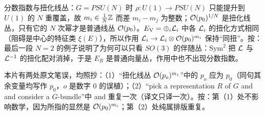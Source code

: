 \begin{yizhu}[易错点]
分数指数与扭化线丛：$G=PSU(N)$ 时 $\rho:U(1)\to PSU(N)$ 只能提升到 $U(1)$ 的 $N$ 重覆盖，故 $m_i\in{1\over N}\Bbb{Z}$ 而差 $m_i-m_j$ 为整数；${\cal O}(p_0)^{1/N}$ 是扭化线丛，只有它的 $N$ 次幂才是普通线丛 ${\cal O}(p_0)$。$E_\VV=\oplus_i{\cal L}_i$ 中各 ${\cal L}_i$ 的扭化方式相同（阻碍是中心的特征类 $\xi(E)$），所以作用 ${\cal L}_i\to{\cal L}_i\otimes{\cal O}(p_0)^{m_i}$ 保持“同扭”。按：最后一段 $N=2$ 的例子说明了为何可以只看 $SO(3)$ 的伴随丛：$\mathrm{Sym}^2$ 把 ${\cal L}$ 与 ${\cal L}^{-1}$ 的扭化配对消掉，于是 $E_R$ 是普通向量丛，作用中也不出现分数指数。
\end{yizhu}

\begin{yizhu}[原文疑误]
本片有两处原文笔误，均照抄：（1）“扭化线丛 ${\cal O}(p_o)^{m_i}$”中的 $p_o$ 应为 $p_0$（同句其余变量均写作 $p_0$，$o$ 是数字 $0$ 的误植）；（2）“pick a representation $R$ of $G$ and and consider a $G$-bundle”中 and 重复一次（译文只译一次）。按：第（1）处不影响数学，因为所指的显然是 ${\cal O}(p_0)^{m_i}$；第（2）处纯属排版重复。
\end{yizhu}

